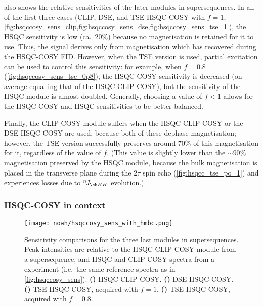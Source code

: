  also shows the relative sensitivities of the later modules in  supersequences.
In all of the first three cases (CLIP, DSE, and TSE HSQC-COSY with $f = 1$, \cref{fig:hsqccosy_sens_clip,fig:hsqccosy_sens_dse,fig:hsqccosy_sens_tse_1}), the HSQC sensitivity is low (ca.\ 20\%) because no  magnetisation is retained for it to use.
Thus, the signal derives only from  magnetisation which has recovered during the HSQC-COSY FID.
However, when the TSE version is used, partial  excitation can be used to control this sensitivity: for example, when $f = 0.8$ (\cref{fig:hsqccosy_sens_tse_0p8}), the HSQC-COSY sensitivity is decreased (on average equalling that of the HSQC-CLIP-COSY), but the sensitivity of the HSQC module is almost doubled.
Generally, choosing a value of $f < 1$ allows for the HSQC-COSY and HSQC sensitivities to be better balanced.

Finally, the CLIP-COSY module suffers when the HSQC-CLIP-COSY or the DSE HSQC-COSY are used, because both of these dephase  magnetisation;
however, the TSE version successfully preserves around $70\%$ of this magnetisation for it, regardless of the value of $f$.
(This value is slightly lower than the $\sim 90\%$ magnetisation preserved by the HSQC module, because the bulk magnetisation is placed in the transverse plane during the $2\tau$ spin echo (\cref{fig:hsqcc_tse_po_1}) and experiences losses due to $\nJ{HH}$ evolution.)


\subsubsection{HSQC-COSY in context}

\begin{figure}[!ht]
    \centering
    \texttt{[image: noah/hsqccosy\_sens\_with\_hmbc.png]}%
    {\label{fig:hsqccosy_sens_with_hmbc_clip}}%
    {\label{fig:hsqccosy_sens_with_hmbc_dse}}%
    {\label{fig:hsqccosy_sens_with_hmbc_tse_1}}%
    {\label{fig:hsqccosy_sens_with_hmbc_tse_0p8}}%
    \caption[Sensitivity comparisons for  supersequences]{
        Sensitivity comparisons for the three last modules in  supersequences.
        Peak intensities are relative to the HSQC-CLIP-COSY module from a  supersequence, and HSQC and CLIP-COSY spectra from a  experiment (i.e.\ the same reference spectra as in \cref{fig:hsqccosy_sens}).
        \textbf{()} HSQC-CLIP-COSY.
        \textbf{()} DSE HSQC-COSY.
        \textbf{()} TSE HSQC-COSY, acquired with $f = 1$.
        \textbf{()} TSE HSQC-COSY, acquired with $f = 0.8$.
    }
    \label{fig:hsqccosy_sens_with_hmbc}
\end{figure}

